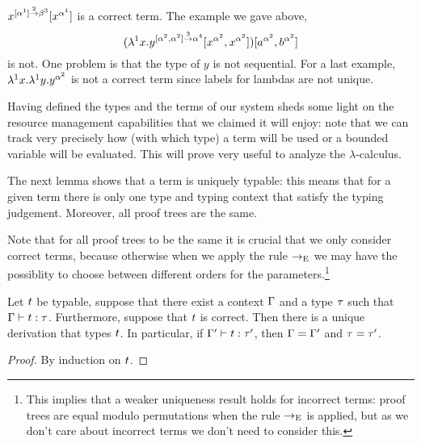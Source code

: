 \begin{example}
$x^{[\alpha^1] \overset{2}{\to} \beta^3}[x^{\alpha^1}]$ is a correct term.
The example we gave above,
\[(\lambda^{1} x. y^{[\alpha^2, \alpha^2] \overset{3}{\to} \alpha^4} [x^{\alpha^2}, x^{\alpha^2}])
[a^{\alpha^2}, b^{\alpha^2}]\]
is not.
One problem is that the type of $y$ is not sequential.
For a last example,
$\lambda^{1} x. \lambda^{1} y. y^{\alpha^2}$
is not a correct term since labels for lambdas are not unique.
\end{example}


Having defined the types and the terms of our system
sheds some light on the resource management capabilities that we claimed it will enjoy:
note that we can track very precisely how (\ie with which type) a term will be used or
a bounded variable will be evaluated.
This will prove very useful to analyze the $\lambda$-calculus.

The next lemma shows that a term is uniquely typable: this means that for a given term
there is only one type and typing context that satisfy the typing judgement.
Moreover, all proof trees are the same.

Note that for all proof trees to be the same it is crucial that
we only consider correct terms, because otherwise when we apply the rule
$\to_{\mathrm{E}}$ we may have the possiblity to choose between different orders for the
parameters.\footnote{This implies that a weaker uniqueness result holds for
incorrect terms: proof trees are equal modulo permutations when the rule $\to_{\mathrm{E}}$
is applied, but as we don't care about incorrect terms we don't need to consider this.}

\begin{lemma}
Let $t$ be typable, \ie suppose that there exist a context $\Gamma$ and a type $\tau$ such that $\Gamma \vdash t : \tau$. Furthermore, suppose that $t$ is correct.
Then there is a unique derivation that types $t$.
In particular, if $\Gamma' \vdash t : \tau'$, then $\Gamma = \Gamma'$ and $\tau = \tau'$.
\end{lemma}
\begin{proof}
By induction on $t$.
\end{proof}

